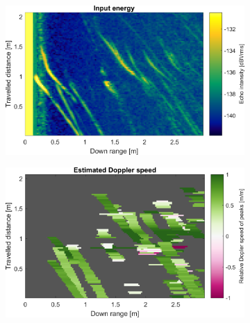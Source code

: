 \begin{figure}[htbp]
    \centering
    \begin{subfigure}[t]{0.475\linewidth}
        \centering
        \includegraphics[width=\linewidth,max height=.475\textheight]{gfx/results/kitchen_input.png}
    \end{subfigure}%
    \hfill%
    \begin{subfigure}[t]{0.475\linewidth}  
        \centering 
        \includegraphics[width=\linewidth,max height=.475\textheight]{gfx/results/kitchen_doppler.png}
    \end{subfigure}\bigskip\\
    \begin{subfigure}[t]{0.5\linewidth}   
        \centering 

\end{subfigure}
\end{figure}
